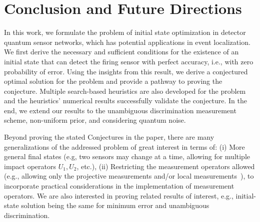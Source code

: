 \section{Conclusion and Future Directions}
\label{sec:tqc-conclusion}

In this work, we formulate the problem of initial state optimization in detector quantum sensor networks, which has potential applications in event localization.
We first derive the necessary and sufficient conditions for the existence of an initial state that can detect the firing sensor with perfect accuracy, i.e., with zero probability of error.
Using the insights from this result, we derive a conjectured optimal solution for the problem and provide a pathway to proving the conjecture.
Multiple search-based heuristics are also developed for the problem and the heuristics' numerical results successfully validate the conjecture.
In the end, we extend our results to the unambiguous discrimination measurement scheme, non-uniform prior, and considering quantum noise.

Beyond proving the stated Conjectures in the paper, there are many generalizations of the addressed
\iso problem of great interest in terms of: 
(i) More general final states (e.g, two sensors may change at a time, allowing for multiple impact operators $U_1, U_2$, etc.), 
(ii) Restricting the measurement operators allowed (e.g., allowing only the projective measurements and/or local measurements~\cite{umd-entanglement}), to incorporate practical considerations in the implementation of measurement operators. 
We are also interested in proving related results of interest, e.g., \iso initial-state solution being the same for minimum error and unambiguous discrimination.

